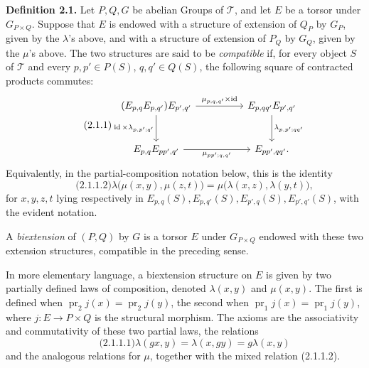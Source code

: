 \documentclass[11pt]{article}
\providecommand{\pr}{\operatorname{pr}}
\providecommand{\id}{\operatorname{id}}
\begin{document}
\textbf{Definition 2.1.}  Let \(P,Q,G\) be abelian Groups of \(\mathcal T\), and let \(E\) be a torsor under \(G_{P\times Q}\).  Suppose that \(E\) is endowed with a structure of extension of \(Q_P\) by \(G_P\), given by the \(\lambda\)'s above, and with a structure of extension of \(P_Q\) by \(G_Q\), given by the \(\mu\)'s above.  The two structures are said to be \emph{compatible} if, for every object \(S\) of \(\mathcal T\) and every \(p,p'\in P(S)\), \(q,q'\in Q(S)\), the following square of contracted products commutes:
\begin{equation}\qquad\text{(2.1.1)}
\begin{tikzcd}[column sep=huge,row sep=large]
(E_{p,q}E_{p,q'})E_{p',q'}
\arrow[r,"\mu_{p;q,q'}\times\id"]
\arrow[d,"\id\times\lambda_{p,p';q'}"']
& E_{p,qq'}E_{p',q'}\arrow[d,"\lambda_{p,p';qq'}"]\\
E_{p,q}E_{pp',q'}\arrow[r,"\mu_{pp';q,q'}"']&E_{pp',qq'} .
\end{tikzcd}
\end{equation}
Equivalently, in the partial-composition notation below, this is the identity
\begin{equation}\qquad\text{(2.1.1.2)}
  \lambda\bigl(\mu(x,y),\mu(z,t)\bigr)
  =
  \mu\bigl(\lambda(x,z),\lambda(y,t)\bigr),
\end{equation}
for \(x,y,z,t\) lying respectively in \(E_{p,q}(S),E_{p,q'}(S),E_{p',q}(S),E_{p',q'}(S)\), with the evident notation.

A \emph{biextension} of \((P,Q)\) by \(G\) is a torsor \(E\) under \(G_{P\times Q}\) endowed with these two extension structures, compatible in the preceding sense.

In more elementary language, a biextension structure on \(E\) is given by two partially defined laws of composition, denoted \(\lambda(x,y)\) and \(\mu(x,y)\).  The first is defined when \(\pr_2 j(x)=\pr_2 j(y)\), the second when \(\pr_1 j(x)=\pr_1 j(y)\), where \(j:E\to P\times Q\) is the structural morphism.  The axioms are the associativity and commutativity of these two partial laws, the relations
\begin{equation}\qquad\text{(2.1.1.1)}
  \lambda(gx,y)=\lambda(x,gy)=g\lambda(x,y)
\end{equation}
and the analogous relations for \(\mu\), together with the mixed relation (2.1.1.2).
\end{document}
